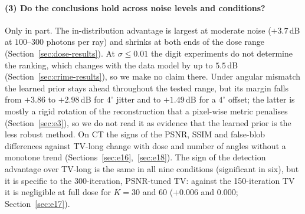 \paragraph{(3) Do the conclusions hold across noise levels and conditions?}
Only in part. The in-distribution advantage is largest at moderate noise ($+3.7$\,dB at $100$--$300$ photons per ray) and shrinks at both ends of the dose range (Section~\ref{sec:dose-results}). At $\sigma\le0.01$ the digit experiments do not determine the ranking, which changes with the data model by up to $5.5$\,dB (Section~\ref{sec:crime-results}), so we make no claim there. Under angular mismatch the learned prior stays ahead throughout the tested range, but its margin falls from $+3.86$ to $+2.98$\,dB for $4^\circ$ jitter and to $+1.49$\,dB for a $4^\circ$ offset; the latter is mostly a rigid rotation of the reconstruction that a pixel-wise metric penalises (Section~\ref{sec:e3}), so we do not read it as evidence that the learned prior is the less robust method.
On CT the signs of the PSNR, SSIM and false-blob differences against TV-long change with dose and number of angles without a monotone trend (Sections~\ref{sec:e16},~\ref{sec:e18}). The sign of the detection advantage over TV-long is the same in all nine conditions (significant in six), but it is specific to the 300-iteration, PSNR-tuned TV: against the 150-iteration TV it is negligible at full dose for $K=30$ and $60$ ($+0.006$ and $0.000$; Section~\ref{sec:e17}).

